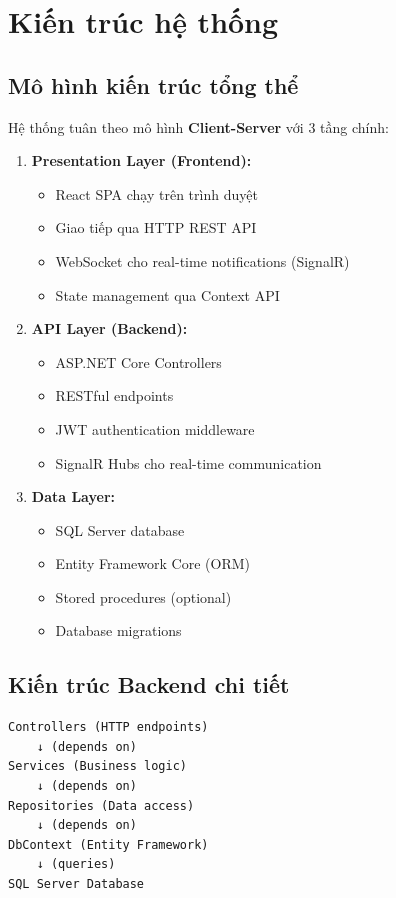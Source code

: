 \section{Kiến trúc hệ thống}

\subsection{Mô hình kiến trúc tổng thể}
Hệ thống tuân theo mô hình \textbf{Client-Server} với 3 tầng chính:

\begin{enumerate}
    \item \textbf{Presentation Layer (Frontend):}
    \begin{itemize}
        \item React SPA chạy trên trình duyệt
        \item Giao tiếp qua HTTP REST API
        \item WebSocket cho real-time notifications (SignalR)
        \item State management qua Context API
    \end{itemize}

    \item \textbf{API Layer (Backend):}
    \begin{itemize}
        \item ASP.NET Core Controllers
        \item RESTful endpoints
        \item JWT authentication middleware
        \item SignalR Hubs cho real-time communication
    \end{itemize}

    \item \textbf{Data Layer:}
    \begin{itemize}
        \item SQL Server database
        \item Entity Framework Core (ORM)
        \item Stored procedures (optional)
        \item Database migrations
    \end{itemize}
\end{enumerate}

\subsection{Kiến trúc Backend chi tiết}
\begin{verbatim}
Controllers (HTTP endpoints)
    ↓ (depends on)
Services (Business logic)
    ↓ (depends on)
Repositories (Data access)
    ↓ (depends on)
DbContext (Entity Framework)
    ↓ (queries)
SQL Server Database
\end{verbatim}


